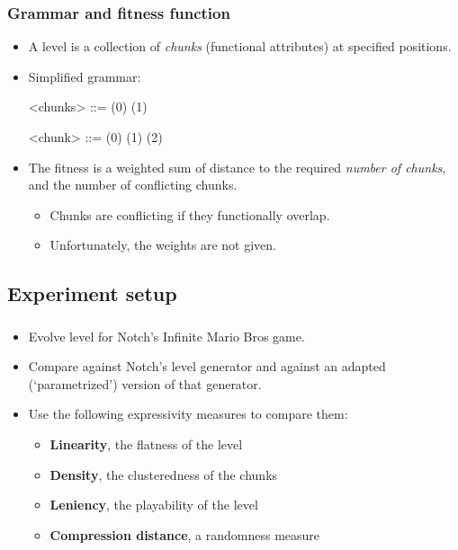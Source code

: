 \documentclass{beamer}
\makeatletter
\newcommand*{\currentname}{\@currentlabelname}
\makeatother
\begin{document}
\begin{frame}
\frametitle{Grammar and fitness function}
\begin{itemize}
\item A level is a collection of \textit{chunks} (functional attributes) at specified positions.
\item Simplified grammar:
\vspace{1em}\begin{grammar}
<chunks> ::=  \hfill (0) \hspace{1em}
        \alt {}  \hfill (1) \hspace{1em}
        
<chunk>  ::= \lit*{,}\lit*{,}\lit*{)} \hfill (0) \hspace{1em}
        \alt {}\lit*{,}\lit*{,}\lit*{)} \hfill (1) \hspace{1em}
        \alt {}\lit*{,}\lit*{,}\lit*{)} \hfill (2) \hspace{1em}
        \alt [...]
\end{grammar}\vspace{1em}
\item The fitness is a weighted sum of distance to the required \textit{number of chunks}, and the number of conflicting chunks.
\begin{itemize}
\item Chunks are conflicting if they functionally overlap.
\item Unfortunately, the weights are not given.
\end{itemize}
\end{itemize}
\end{frame}

\subsection{Experiment setup}
\begin{frame}
\frametitle{\currentname}
\begin{itemize}
\item Evolve level for Notch's Infinite Mario Bros game.
\item Compare against Notch's level generator and against an adapted (`parametrized') version of that generator.
\item Use the following expressivity measures to compare them:
\begin{itemize}
\item \textbf{Linearity}, the flatness of the level
\item \textbf{Density}, the clusteredness of the chunks
\item \textbf{Leniency}, the playability of the level
\item \textbf{Compression distance}, a randomness measure
\end{itemize}
\end{itemize}
\end{frame}
\end{document}
